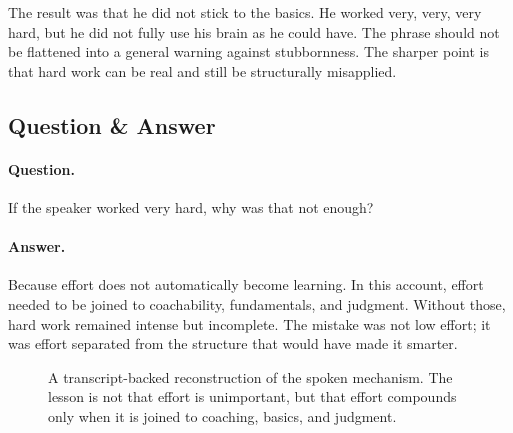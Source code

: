 The result was that he did not stick to the basics. He worked very, very, very hard, but he did not fully use his brain as he could have. The phrase should not be flattened into a general warning against stubbornness. The sharper point is that hard work can be real and still be structurally misapplied.

\subsection{Question \& Answer}

\paragraph{Question.}
If the speaker worked very hard, why was that not enough?

\paragraph{Answer.}
Because effort does not automatically become learning. In this account, effort needed to be joined to coachability, fundamentals, and judgment. Without those, hard work remained intense but incomplete. The mistake was not low effort; it was effort separated from the structure that would have made it smarter.

\begin{figure}
\centering
{}
\caption{A transcript-backed reconstruction of the spoken mechanism. The lesson is not that effort is unimportant, but that effort compounds only when it is joined to coaching, basics, and judgment.}
\end{figure}

